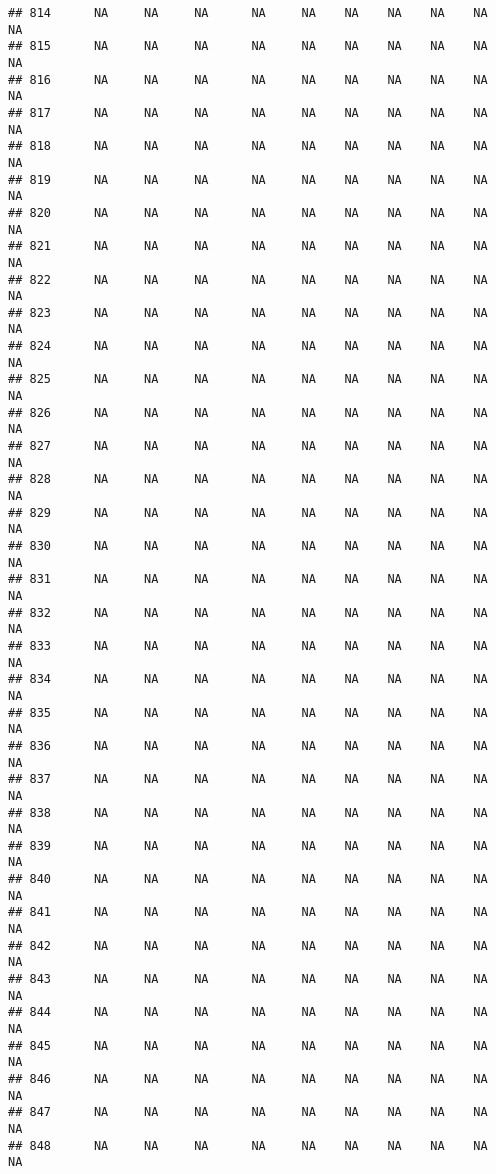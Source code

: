 \documentclass{article}\usepackage{graphicx, color}
\makeatletter
\newenvironment{kframe}{%
 \def\at@end@of@kframe{}%
 \ifinner\ifhmode%
  \def\at@end@of@kframe{\end{minipage}}%
  \begin{minipage}{\columnwidth}%
 \fi\fi%
 \def\FrameCommand##1{\hskip\@totalleftmargin \hskip-\fboxsep
 \colorbox{shadecolor}{##1}\hskip-\fboxsep
     \hskip-\linewidth \hskip-\@totalleftmargin \hskip\columnwidth}%
 \MakeFramed {\advance\hsize-\width
   \@totalleftmargin\z@ \linewidth\hsize
   \@setminipage}}%
 {\par\unskip\endMakeFramed%
 \at@end@of@kframe}
\newenvironment{knitrout}{}{} %
\makeatother
\begin{document}
\begin{knitrout}
\begin{kframe}
\begin{verbatim}
## 814      NA     NA     NA      NA     NA    NA    NA    NA    NA     NA
## 815      NA     NA     NA      NA     NA    NA    NA    NA    NA     NA
## 816      NA     NA     NA      NA     NA    NA    NA    NA    NA     NA
## 817      NA     NA     NA      NA     NA    NA    NA    NA    NA     NA
## 818      NA     NA     NA      NA     NA    NA    NA    NA    NA     NA
## 819      NA     NA     NA      NA     NA    NA    NA    NA    NA     NA
## 820      NA     NA     NA      NA     NA    NA    NA    NA    NA     NA
## 821      NA     NA     NA      NA     NA    NA    NA    NA    NA     NA
## 822      NA     NA     NA      NA     NA    NA    NA    NA    NA     NA
## 823      NA     NA     NA      NA     NA    NA    NA    NA    NA     NA
## 824      NA     NA     NA      NA     NA    NA    NA    NA    NA     NA
## 825      NA     NA     NA      NA     NA    NA    NA    NA    NA     NA
## 826      NA     NA     NA      NA     NA    NA    NA    NA    NA     NA
## 827      NA     NA     NA      NA     NA    NA    NA    NA    NA     NA
## 828      NA     NA     NA      NA     NA    NA    NA    NA    NA     NA
## 829      NA     NA     NA      NA     NA    NA    NA    NA    NA     NA
## 830      NA     NA     NA      NA     NA    NA    NA    NA    NA     NA
## 831      NA     NA     NA      NA     NA    NA    NA    NA    NA     NA
## 832      NA     NA     NA      NA     NA    NA    NA    NA    NA     NA
## 833      NA     NA     NA      NA     NA    NA    NA    NA    NA     NA
## 834      NA     NA     NA      NA     NA    NA    NA    NA    NA     NA
## 835      NA     NA     NA      NA     NA    NA    NA    NA    NA     NA
## 836      NA     NA     NA      NA     NA    NA    NA    NA    NA     NA
## 837      NA     NA     NA      NA     NA    NA    NA    NA    NA     NA
## 838      NA     NA     NA      NA     NA    NA    NA    NA    NA     NA
## 839      NA     NA     NA      NA     NA    NA    NA    NA    NA     NA
## 840      NA     NA     NA      NA     NA    NA    NA    NA    NA     NA
## 841      NA     NA     NA      NA     NA    NA    NA    NA    NA     NA
## 842      NA     NA     NA      NA     NA    NA    NA    NA    NA     NA
## 843      NA     NA     NA      NA     NA    NA    NA    NA    NA     NA
## 844      NA     NA     NA      NA     NA    NA    NA    NA    NA     NA
## 845      NA     NA     NA      NA     NA    NA    NA    NA    NA     NA
## 846      NA     NA     NA      NA     NA    NA    NA    NA    NA     NA
## 847      NA     NA     NA      NA     NA    NA    NA    NA    NA     NA
## 848      NA     NA     NA      NA     NA    NA    NA    NA    NA     NA

\end{verbatim}
\end{kframe}
\end{knitrout}
\end{document}
